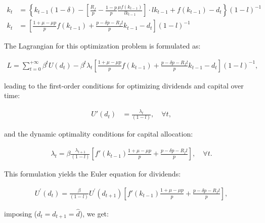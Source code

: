 \documentclass[12pt]{article}
\begin{document}
\begin{align}
    k_t &= \left\{k_{t-1}(1 - \delta) - \left[\frac{R_f}{p}  -\frac{ 1-p }{ p }\frac{\mu f(k_{t-1})}{l  k_{t-1}}\right] \cdot l k_{t-1} + f(k_{t-1}) - d_{t} \right \}{\left(1-l\right)}^{-1} \nonumber \\
    k_t &= \left[ \frac{1 + \mu - \mu p}{p}f(k_{t-1}) + \frac{p - \delta p - R_f l}{p} k_{t-1}  - d_{t} \right](1-l)^{-1} \label{eq:ff}
\end{align}

The Lagrangian for this optimization problem is formulated as:

\begin{align}
L=\sum_{t=0}^{+\infty}\beta^t U(d_t) - \beta^t \lambda_t\left[ \frac{1 + \mu - \mu p}{p}f(k_{t-1}) + \frac{p - \delta p - R_f l}{p} k_{t-1}  - d_{t} \right](1-l)^{-1},
\end{align}

leading to the first-order conditions for optimizing dividends and capital over time:


\begin{align}
    U'(d_t) &= \frac{\lambda_t}{\left(1-l\right)}, \quad \forall t,
\end{align}


and the dynamic optimality conditions for capital allocation:


\begin{align}
    \lambda_t = \beta \frac{\lambda_{t+1}}{\left(1-l\right)} \left[ f'(k_{t-1})\frac{1 + \mu - \mu p}{p} + \frac{p - \delta p - R_f l}{p} \right], \quad \forall t.
\end{align}


This formulation yields the Euler equation for dividends:

\begin{align}
U^{\prime}(d_{t})=\frac{\beta}{\left(1-l\right)} U^{\prime}(d_{t+1})\left[ f'(k_{t-1})\frac{1 + \mu - \mu p}{p} + \frac{p - \delta p - R_f l}{p} \right],
\end{align}

imposing (\(d_t = d_{t+1} =\hat{d}\)), we get:
\end{document}
